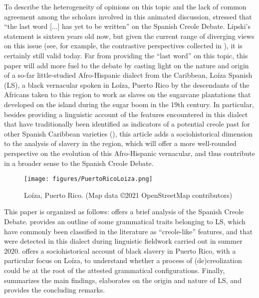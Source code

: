 \documentclass[output=paper,colorlinks,citecolor=brown]{langscibook}
\begin{document}
To describe the heterogeneity of opinions on this topic and the lack of common agreement among the scholars involved in this animated discussion, \citet[304]{Lipski2005} stressed that “the last word [...] has yet to be written” on the Spanish Creole Debate. Lipski’s statement is sixteen years old now, but given the current range of diverging views on this issue (see, for example, the contrastive perspectives collected in \citealt{Sessarego2018_lingua}), it is certainly still valid today. Far from providing the “last word” on this topic, this paper will add more fuel to the debate by casting light on the nature and origin of a so-far little-studied Afro-Hispanic dialect from the Caribbean, Loíza Spanish (LS), a black vernacular spoken in Loíza, Puerto Rico by the descendants of the Africans taken to this region to work as slaves on the sugarcane plantations that developed on the island during the sugar boom in the 19th century. In particular, besides providing a linguistic account of the features encountered in this dialect that have traditionally been identified as indicators of a potential creole past for other Spanish Caribbean varieties (\citealt{Grandade1968,Otheguy1973}), this article adds a sociohistorical dimension to the analysis of slavery in the region, which will offer a more well-rounded perspective on the evolution of this Afro-Hispanic vernacular, and thus contribute in a broader sense to the Spanish Creole Debate.

\begin{figure}
\texttt{[image: figures/PuertoRicoLoiza.png]}

\caption{Loíza, Puerto Rico. (Map data ©2021 OpenStreetMap contributors)}
\label{fig:visconti:1}
\end{figure}

This paper is organized as follows:  offers a brief analysis of the Spanish Creole Debate.  provides an outline of some grammatical traits belonging to LS, which have commonly been classified in the literature as “creole-like” features, and that were detected in this dialect during linguistic fieldwork carried out in summer 2020.  offers a sociohistorical account of black slavery in Puerto Rico, with a particular focus on Loíza, to understand whether a process of (de)creol\-i\-za\-tion could be at the root of the attested grammatical configurations. Finally,  summarizes the main findings, elaborates on the origin and nature of LS, and provides the concluding remarks.
\end{document}
